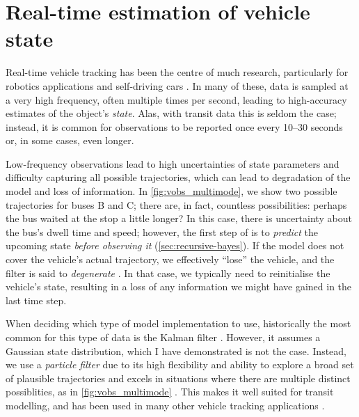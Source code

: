 \section{Real-time estimation of vehicle state}
\label{sec:vehicle_model}

Real-time vehicle tracking has been the centre of much research, particularly for robotics applications and self-driving cars \citep{Daum_2005, Gustafsson_2002}. In many of these, data is sampled at a very high frequency, often multiple times per second, leading to high-accuracy estimates of the object's \emph{state}. Alas, with transit data this is seldom the case; instead, it is common for observations to be reported once every 10--30 seconds or, in some cases, even longer.

Low-frequency observations lead to high uncertainties of state parameters and difficulty capturing all possible trajectories, which can lead to degradation of the model and loss of information. In \cref{fig:vobs_multimode}, we show two possible trajectories for buses B and C; there are, in fact, countless possibilities: perhaps the bus waited at the stop a little longer? In this case, there is uncertainty about the bus's dwell time and speed; however, the first step of  is to \emph{predict} the upcoming state \emph{before observing it} (\cref{sec:recursive-bayes}). If the model does not cover the vehicle's actual trajectory, we effectively ``lose'' the vehicle, and the filter is said to \emph{degenerate} \citep{Chen_2014}. In that case, we typically need to reinitialise the vehicle's state, resulting in a loss of any information we might have gained in the last time step.

When deciding which type of model implementation to use, historically the most common for this type of data is the Kalman filter \citep{Wall_1999, Dailey_2001, Cathey_2003}. However, it assumes a Gaussian state distribution, which I have demonstrated is not the case. Instead, we use a \emph{particle filter} due to its high flexibility and ability to explore a broad set of plausible trajectories \citep{Hans_2015} and excels in situations where there are multiple distinct possiblities, as in \cref{fig:vobs_multimode} \citep{Ulmke_2006}. This makes it well suited for transit modelling, and has been used in many other vehicle tracking applications \citep{Davidson_2011,Gustafsson_2002,Gustafsson_2010,Ulmke_2006}.

